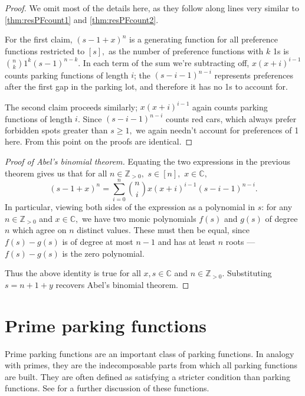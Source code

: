 \documentclass[12 pt]{amsart}
\theoremstyle{definition} %
\theoremstyle{remark} %
\begin{document}
\begin{proof}
    We omit most of the details here, as they follow along lines very similar to \cref{thm:resPFcount1} and \cref{thm:resPFcount2}.
    
    For the first claim, $(s-1+x)^n$ is a generating function for all preference functions restricted to $[s],$ as the number of preference functions with $k$ 1s is $\binom{n}{k}1^k(s-1)^{n-k}.$ In each term of the sum we're subtracting off, $x(x+i)^{i-1}$  counts parking functions of length $i$; the $(s-i-1)^{n-i}$ represents preferences after the first gap in the parking lot, and therefore it has no 1s to account for.

    The second claim proceeds similarly; $x(x+i)^{i-1}$ again counts parking functions of length $i$. Since $(s-i-1)^{n-i}$ counts red cars, which always prefer forbidden spots greater than $s\ge1,$ we again needn't account for preferences of 1 here. From this point on the proofs are identical.
\end{proof}

\begin{proof}[Proof of Abel's binomial theorem]
	Equating the two expressions in the previous theorem gives us that for all $n\in\mathbb{Z}_{>0},$ $s\in [n],$ $x\in\mathbb{C},$
	\[
		(s-1+x)^{n} = \sum_{i = 0}^{n} \binom{n}{i} x(x + i)^{i - 1} (s - i - 1)^{n - i}.
	\]
In particular, viewing both sides of the expression as a polynomial in $s$: for any $n\in\mathbb{Z}_{>0}$ and $x\in\mathbb{C},$ we have two monic polynomials $f(s)$ and $g(s)$ of degree $n$ which agree on $n$ distinct values. These must then be equal, since $f(s)-g(s)$ is of degree at most $n-1$ and has at least $n$ roots --- $f(s) - g(s)$ is the zero polynomial.

Thus the above identity is true for all $x,s\in\mathbb{C}$ and $n\in\mathbb{Z}_{>0}$. Substituting $s=n+1+y$ recovers Abel's binomial theorem.

\end{proof}

\section{Prime parking functions} \label{primesection}

Prime parking functions are an important class of parking functions. In analogy with primes, they are the indecomposable parts from which all parking functions are built. They are often defined as satisfying a stricter condition than parking functions. See \cite{armon-2024} for a further discussion of these functions.
\end{document}
